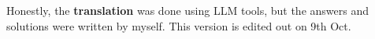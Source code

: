 \documentclass[a4paper]{article}
\begin{document}
\section*{  }
Honestly, the \textbf{translation} was done using LLM tools, but the answers and solutions were written by myself.
This version is edited out on 9th Oct.


\end{document}
